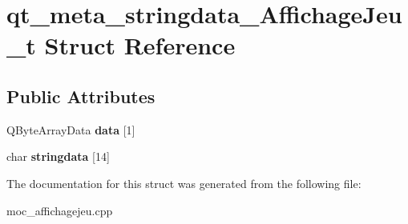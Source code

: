 \hypertarget{structqt__meta__stringdata__AffichageJeu__t}{\section{qt\+\_\+meta\+\_\+stringdata\+\_\+\+Affichage\+Jeu\+\_\+t Struct Reference}
\label{structqt__meta__stringdata__AffichageJeu__t}
}
\subsection*{Public Attributes}
\begin{DoxyCompactItemize}
\item 
\hypertarget{structqt__meta__stringdata__AffichageJeu__t_a9e6727643de2550395b112dbca6f53fb}{Q\+Byte\+Array\+Data {\bfseries data} \mbox{[}1\mbox{]}}\label{structqt__meta__stringdata__AffichageJeu__t_a9e6727643de2550395b112dbca6f53fb}

\item 
\hypertarget{structqt__meta__stringdata__AffichageJeu__t_a4a947fe89aebb3bf8da241189c3efd48}{char {\bfseries stringdata} \mbox{[}14\mbox{]}}\label{structqt__meta__stringdata__AffichageJeu__t_a4a947fe89aebb3bf8da241189c3efd48}

\end{DoxyCompactItemize}


The documentation for this struct was generated from the following file\+:\begin{DoxyCompactItemize}
\item 
moc\+\_\+affichagejeu.\+cpp\end{DoxyCompactItemize}

